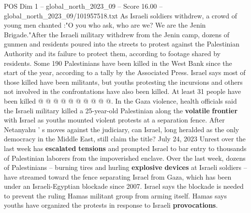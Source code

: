 \begin{textsample}{POS Dim 1 – global\_north\_2023\_09 – Score 16.00 – global\_north\_2023\_09/101957518.txt}
As Israeli soldiers withdrew, a crowd of young men chanted :"O you who ask, who are we?
We are the Jenin Brigade."After the Israeli military withdrew from the Jenin camp, dozens of gunmen and residents poured into the streets to protest against the Palestinian Authority and its failure to protect them, according to footage shared by residents.
Some 190 Palestinians have been killed in the West Bank since the start of the year, according to a tally by the Associated Press.
Israel says most of those killed have been militants, but youths protesting the incursions and others not involved in the confrontations have also been killed.
At least 31 people have been killed @ @ @ @ @ @ @ @ @ @.
In the Gaza violence, health officials said the Israeli military killed a 25-year-old Palestinian along the \textbf{volatile} \textbf{frontier} with Israel as youths mounted violent protests at a separation fence.
After Netanyahu ' s moves against the judiciary, can Israel, long heralded as the only democracy in the Middle East, still claim the title?
July 24, 2023 Unrest over the last week has \textbf{escalated} \textbf{tensions} and prompted Israel to bar entry to thousands of Palestinian laborers from the impoverished enclave.
Over the last week, dozens of Palestinians -- burning tires and hurling \textbf{explosive} \textbf{devices} at Israeli soldiers -- have streamed toward the fence separating Israel from Gaza, which has been under an Israeli-Egyptian blockade since 2007.
Israel says the blockade is needed to prevent the ruling Hamas militant group from arming itself.
Hamas says youths have organized the protests in response to Israeli \textbf{provocations}.

\end{textsample}
